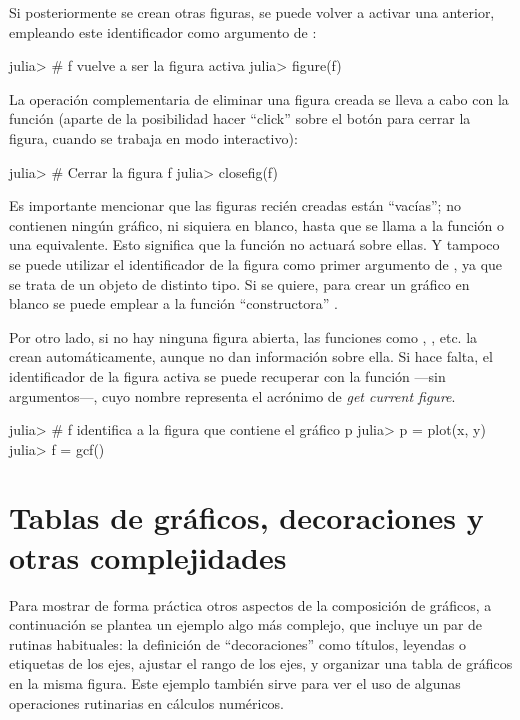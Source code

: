 Si posteriormente se crean otras figuras, se puede volver a activar una anterior, empleando este identificador como argumento de :

\begin{jlconcode}
julia> # f vuelve a ser la figura activa
julia> figure(f)
\end{jlconcode}

La operación complementaria de eliminar una figura creada se lleva a cabo con la función  (aparte de la posibilidad hacer ``click'' sobre el botón para cerrar la figura, cuando se trabaja en modo interactivo):

\begin{jlconcode}
julia> # Cerrar la figura f
julia> closefig(f)
\end{jlconcode}

Es importante mencionar que las figuras recién creadas están ``vacías''; no contienen ningún gráfico, ni siquiera en blanco, hasta que se llama a la función  o una equivalente. Esto significa que la función  no actuará sobre ellas. Y tampoco se puede utilizar el identificador de la figura como primer argumento de , ya que se trata de un objeto de distinto tipo. Si se quiere, para crear un gráfico en blanco se puede emplear a la función ``constructora'' .

Por otro lado, si no hay ninguna figura abierta, las funciones como , , etc. la crean automáticamente, aunque no dan información sobre ella. Si hace falta, el identificador de la figura activa se puede recuperar con la función  ---sin argumentos---, cuyo nombre representa el acrónimo de \emph{get current figure}.

\begin{jlconcode}
julia> # f identifica a la figura que contiene el gráfico p
julia> p = plot(x, y)
julia> f = gcf()
\end{jlconcode}


\section{Tablas de gráficos, decoraciones y otras complejidades}

Para mostrar de forma práctica otros aspectos de la composición de gráficos, a continuación se plantea un ejemplo algo más complejo, que incluye un par de rutinas habituales: la definición de ``decoraciones'' como títulos, leyendas o etiquetas de los ejes, ajustar el rango de los ejes, y organizar una tabla de gráficos en la misma figura. Este ejemplo también sirve para ver el uso de algunas operaciones rutinarias en cálculos numéricos.

